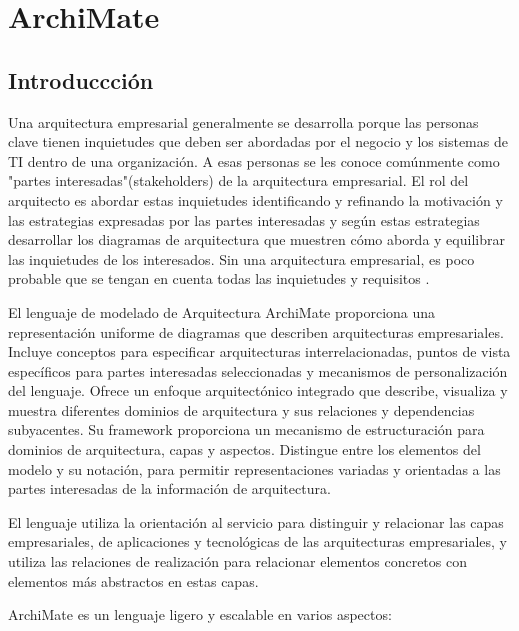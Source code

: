 \chapter{ArchiMate}
\section{Introduccción}
Una arquitectura empresarial generalmente se desarrolla porque las personas clave tienen inquietudes que deben ser abordadas por el negocio y los sistemas de TI dentro de una organización. A esas personas se les conoce comúnmente como "partes interesadas"(stakeholders) de la arquitectura empresarial. El rol del arquitecto es abordar estas inquietudes identificando y refinando la motivación y las estrategias expresadas por las partes interesadas y según estas estrategias desarrollar los  diagramas de arquitectura que muestren cómo aborda y equilibrar las inquietudes de los interesados. Sin una arquitectura empresarial, es poco probable que se tengan en cuenta todas las inquietudes y requisitos \cite{ArchiMate1.0}. 

El lenguaje de modelado de Arquitectura ArchiMate proporciona una representación uniforme de diagramas que describen arquitecturas empresariales. Incluye conceptos para especificar arquitecturas interrelacionadas, puntos de vista específicos para partes interesadas seleccionadas y mecanismos de personalización del lenguaje. Ofrece un enfoque arquitectónico integrado que describe, visualiza y muestra diferentes dominios de arquitectura y sus relaciones y dependencias subyacentes. Su framework proporciona un mecanismo de estructuración para dominios de arquitectura, capas y aspectos. Distingue entre los elementos del modelo y su notación, para permitir representaciones variadas y orientadas a las partes interesadas de la información de arquitectura.

\newpage
El lenguaje utiliza la orientación al servicio para distinguir y relacionar las capas empresariales, de aplicaciones y tecnológicas de las arquitecturas empresariales, y utiliza las relaciones de realización para relacionar elementos concretos con elementos más abstractos en estas capas.

ArchiMate es un lenguaje ligero y escalable en varios aspectos:

